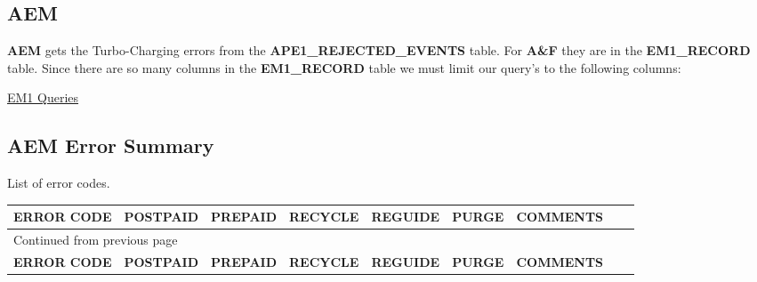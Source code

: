\documentclass[12pt,twoside]{article}
\begin{document}
\newpage 
\begin{landscape}  
\section{AEM}
\label{sec:orgheadline70}
\textbf{AEM} gets the Turbo-Charging errors from the
\textbf{APE1\_REJECTED\_EVENTS} table. For \textbf{A\&F} they are in the
\textbf{EM1\_RECORD} table. Since there are so many columns in the
\textbf{EM1\_RECORD} table we must limit our query's to the following
columns:

\href{docs/EM1\%20Query's}{EM1 Queries}

\subsection{AEM Error Summary}
\label{sec:orgheadline68}
List of error codes.

\scriptsize
\begin{longtable}{l|l|l|l|l|l|l|l|l}
\hline
\textbf{ERROR CODE} & \textbf{POSTPAID} & \textbf{PREPAID} & \textbf{RECYCLE} & \textbf{REGUIDE} & \textbf{PURGE} & \textbf{COMMENTS}\\
\hline
\endfirsthead
\multicolumn{7}{l}{Continued from previous page} \\
\hline

\textbf{ERROR CODE} & \textbf{POSTPAID} & \textbf{PREPAID} & \textbf{RECYCLE} & \textbf{REGUIDE} & \textbf{PURGE} & \textbf{COMMENTS} \\


\end{longtable}
\end{landscape}
\end{document}
